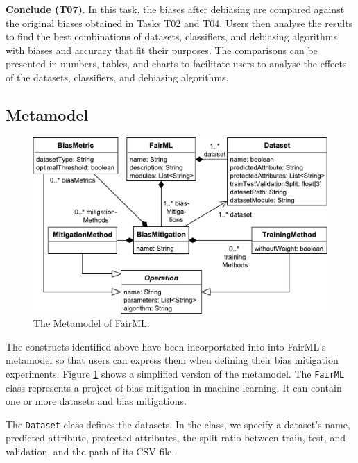 \documentclass[sigconf,review]{acmart}
\begin{document}
{	\textbf{Conclude (T07)}. In this task, the biases after debiasing are compared against the original biases obtained in Tasks T02 and T04. Users then analyse the results to find the best combinations of datasets, classifiers, and debiasing algorithms with biases and accuracy that fit their purposes. The comparisons can be presented in numbers, tables, and charts to facilitate users to analyse the effects of the datasets, classifiers, and debiasing algorithms. 
	
	\subsection{Metamodel}
	\label{sec:metamodel}
	
	\begin{figure}
		\includegraphics[width=\linewidth]{figures/metamodel}
		\caption{The Metamodel of FairML.}
		\label{fig:metamodel}
	\end{figure}
	
	The constructs identified above have been incorportated into into FairML's metamodel so that users can express them when defining their bias mitigation experiments. Figure \ref{fig:metamodel} shows a simplified version of the metamodel. The \texttt{FairML} class represents a project of bias mitigation in machine learning. It can contain one or more datasets and bias mitigations. 
	
	The \texttt{Dataset} class defines the datasets. In the class, we specify a dataset's name, predicted attribute, protected attributes, the split ratio between train, test, and validation, and the path of its CSV file.
	
}
\end{document}
